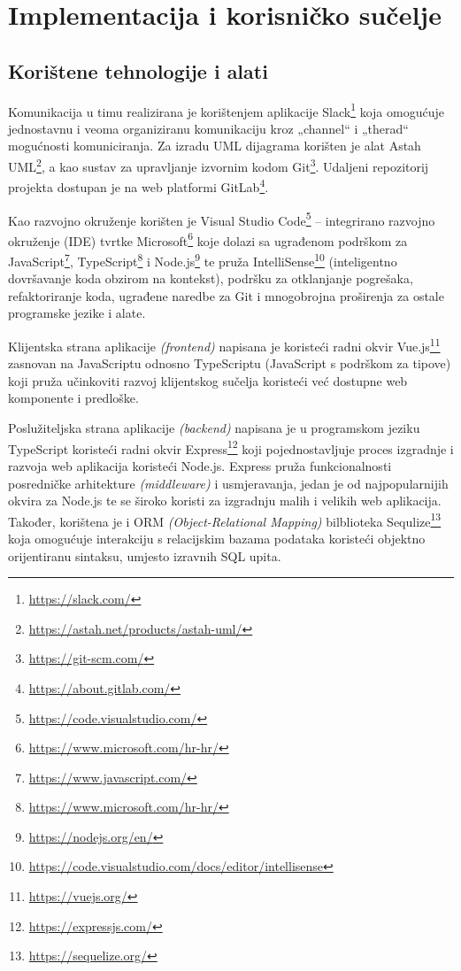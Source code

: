 \chapter{Implementacija i korisničko sučelje}
		
		
		\section{Korištene tehnologije i alati}
		
 Komunikacija u timu realizirana je korištenjem aplikacije Slack\footnote{\url{https://slack.com/}} koja omogućuje jednostavnu i veoma organiziranu komunikaciju kroz „channel“ i „therad“ mogućnosti komuniciranja. Za izradu UML dijagrama korišten je alat Astah UML\footnote{\url{https://astah.net/products/astah-uml/}}, a kao sustav za upravljanje izvornim kodom Git\footnote{\url{https://git-scm.com/}}. Udaljeni repozitorij projekta dostupan je na web platformi GitLab\footnote{\url{https://about.gitlab.com/}}.

 Kao razvojno okruženje korišten je Visual Studio Code\footnote{\url{https://code.visualstudio.com/}} – integrirano razvojno okruženje (IDE) tvrtke Microsoft\footnote{\url{https://www.microsoft.com/hr-hr/}} koje dolazi sa ugrađenom podrškom za JavaScript\footnote{\url{https://www.javascript.com/}}, TypeScript\footnote{\url{https://www.microsoft.com/hr-hr/}} i Node.js\footnote{\url{https://nodejs.org/en/}} te pruža IntelliSense\footnote{\url{https://code.visualstudio.com/docs/editor/intellisense}} (inteligentno dovršavanje koda obzirom na kontekst), podršku za otklanjanje pogrešaka, refaktoriranje koda, ugrađene naredbe za Git i mnogobrojna proširenja za ostale programske jezike i alate.

 Klijentska strana aplikacije \textit{(frontend)} napisana je koristeći radni okvir Vue.js\footnote{\url{https://vuejs.org/}} zasnovan na JavaScriptu odnosno TypeScriptu (JavaScript s podrškom za tipove) koji pruža učinkoviti razvoj klijentskog sučelja koristeći već dostupne web komponente i predloške.

 Poslužiteljska strana aplikacije \textit{(backend)} napisana je u programskom jeziku TypeScript koristeći radni okvir Express\footnote{\url{https://expressjs.com/}} koji pojednostavljuje proces izgradnje i razvoja web aplikacija koristeći Node.js. Express pruža funkcionalnosti posredničke arhitekture \textit{(middleware)} i usmjeravanja, jedan je od najpopularnijih okvira za Node.js te se široko koristi za izgradnju malih i velikih web aplikacija. Također, korištena je i ORM \textit{(Object-Relational Mapping)} bilblioteka Sequlize\footnote{\url{https://sequelize.org/}} koja omogućuje interakciju s relacijskim bazama podataka koristeći objektno orijentiranu sintaksu, umjesto izravnih SQL upita.

